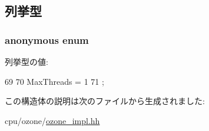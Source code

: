 \subsection{列挙型}
\hypertarget{structOzoneImpl_a458e651af6690959efa2afb96be7d609}{
\subsubsection[{"@36}]{\setlength{\rightskip}{0pt plus 5cm}anonymous enum}}
\label{structOzoneImpl_a458e651af6690959efa2afb96be7d609}
\begin{Desc}
\item[列挙型の値: ]\par
\begin{description}
\item[{\em 
\hypertarget{structOzoneImpl_a458e651af6690959efa2afb96be7d609ab491ddc45d51d0ea7f735c1926390fdb}{
MaxThreads}
\label{structOzoneImpl_a458e651af6690959efa2afb96be7d609ab491ddc45d51d0ea7f735c1926390fdb}
}]\end{description}
\end{Desc}




\begin{DoxyCode}
69          {
70         MaxThreads = 1
71     };
\end{DoxyCode}


この構造体の説明は次のファイルから生成されました:\begin{DoxyCompactItemize}
\item 
cpu/ozone/\hyperlink{ozone__impl_8hh}{ozone\_\-impl.hh}\end{DoxyCompactItemize}
